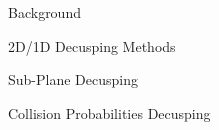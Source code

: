 \begin{frame}[t]{Background}
    
    
    
\end{frame}


\begin{frame}[t]{2D/1D Decusping Methods}
    
    
    
\end{frame}


\begin{frame}[t]{Sub-Plane Decusping}
    
    
    
\end{frame}


\begin{frame}[t]{Collision Probabilities Decusping}
    
    
    
\end{frame}